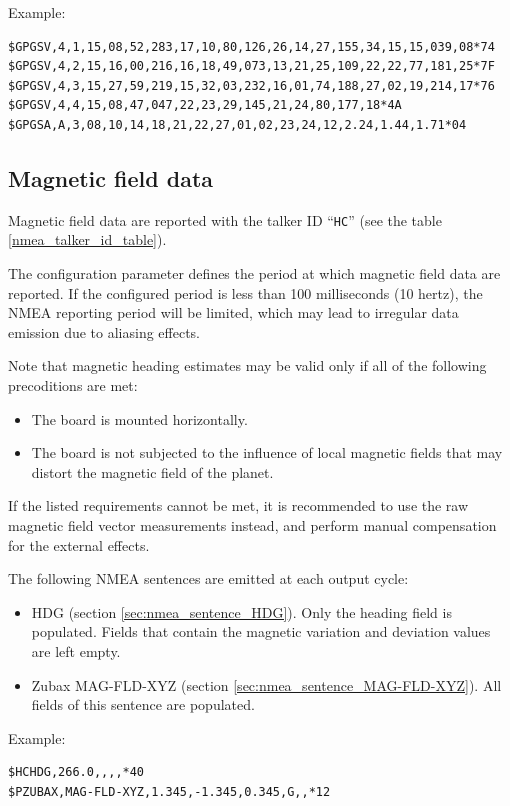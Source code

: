 \documentclass{zubaxdoc}
\begin{document}
Example:
\begin{verbatim}
$GPGSV,4,1,15,08,52,283,17,10,80,126,26,14,27,155,34,15,15,039,08*74
$GPGSV,4,2,15,16,00,216,16,18,49,073,13,21,25,109,22,22,77,181,25*7F
$GPGSV,4,3,15,27,59,219,15,32,03,232,16,01,74,188,27,02,19,214,17*76
$GPGSV,4,4,15,08,47,047,22,23,29,145,21,24,80,177,18*4A
$GPGSA,A,3,08,10,14,18,21,22,27,01,02,23,24,12,2.24,1.44,1.71*04
\end{verbatim}

\subsection{Magnetic field data}

Magnetic field data are reported with the talker ID ``\verb|HC|'' (see the table \ref{nmea_talker_id_table}).

The configuration parameter  defines the period at which magnetic field data are reported.
If the configured period is less than 100 milliseconds (10 hertz),
the NMEA reporting period will be limited,
which may lead to irregular data emission due to aliasing effects.

Note that magnetic heading estimates may be valid only if all of the following precoditions are met:
\begin{itemize}
    \item The board is mounted horizontally.
    \item The board is not subjected to the influence of local magnetic fields that may distort the magnetic field
          of the planet.
\end{itemize}
If the listed requirements cannot be met, it is recommended to use the raw magnetic field vector measurements instead,
and perform manual compensation for the external effects.

The following NMEA sentences are emitted at each output cycle:
\begin{itemize}
    \item HDG (section \ref{sec:nmea_sentence_HDG}). Only the heading field is populated.
          Fields that contain the magnetic variation and deviation values are left empty.
    \item Zubax MAG-FLD-XYZ (section \ref{sec:nmea_sentence_MAG-FLD-XYZ}).
          All fields of this sentence are populated.
\end{itemize}

Example:
\begin{verbatim}
$HCHDG,266.0,,,,*40
$PZUBAX,MAG-FLD-XYZ,1.345,-1.345,0.345,G,,*12
\end{verbatim}
\end{document}
